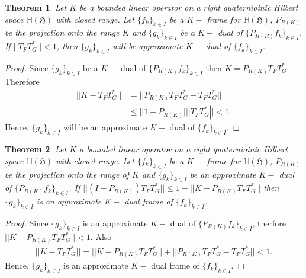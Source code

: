 \documentclass[a4paper,12pt,reqno]{amsart}
\theoremstyle{plain}
\newtheorem{theorem}{\bf Theorem}[section]
\theoremstyle{remark}
\begin{document}
	\begin{theorem}
		Let $K$ be a bounded linear operator on a right quaternioinic Hilbert space $\mathbb{H(\mathfrak{H})}$ with closed range. Let $\{f_k\}_{k\in I}$ be a $K-$ frame for $\mathbb{H(\mathfrak{H})}$,  $P_{R(K)}$ be the projection onto the range $K$ and $\{g_k\}_{k\in I}$ be a $K-$ dual of $\{P_{R(R)}f_k\}_{k\in I}$. \\
		If $||T_FT_G^*||<1$, then $\{g_k\}_{k\in I}$ will be approximate $K-$ dual of $\{f_k\}_{k\in I}$.
		
	\end{theorem}
	\begin{proof}
		Since $\{g_k\}_{k\in I}$ be a $K-$ dual of $\{P_{R(K)}f_k\}_{k\in I}$ then $K=P_{R(K)}T_FT_G^*$. Therefore 
		\begin{align*}
			||K-T_FT_G^*||&=||P_{R(K)}T_FT_G^*-T_FT_G^*||\\
			&\le||1-P_{R(K)}|||T_FT_G^*||<1.
		\end{align*}
		Hence, $\{g_k\}_{k\in I}$ will be an approximate $K-$ dual of $\{f_k\}_{k\in I}$.
	\end{proof}
	
	\begin{theorem}
		Let $K$ a bounded linear operator on a right quaternioinic Hilbert space $\mathbb{H(\mathfrak{H})}$ with closed range. Let $\{f_k\}_{k\in I}$ be a $K-$ frame for $\mathbb{H(\mathfrak{H})}$,  $P_{R(K)}$ be the projection onto the range of $K$ and $\{g_k\}_{k\in I}$ be an approximate $K-$ dual of $\{P_{R(K)}f_k\}_{k\in I}$. If $||(I-P_{R(K)})T_FT_G^*||\le 1-||K-P_{R(K)}T_FT_G^*||$ then $\{g_k\}_{k\in I}$ is an approximate $K-$ dual frame of $\{f_k\}_{k\in I}$.
	\end{theorem}
	
	\begin{proof}
		Since $\{g_k\}_{k\in I}$ is an approximate $K-$ dual of $\{P_{R(K)}f_k\}_{k\in I}$, therfore $||K-P_{R(K)}T_FT_G^*||<1$. Also 
		\begin{align*}
			||K-T_FT_G^*||=||K-P_{R(K)}T_FT_G^*||+||P_{R(K)}T_FT_G^*-T_FT_G^*||<1.
		\end{align*}
		Hence, $\{g_k\}_{k\in I}$ is an approximate $K-$ dual frame of $\{f_k\}_{k\in I}$.
	\end{proof}
	
\end{document}

